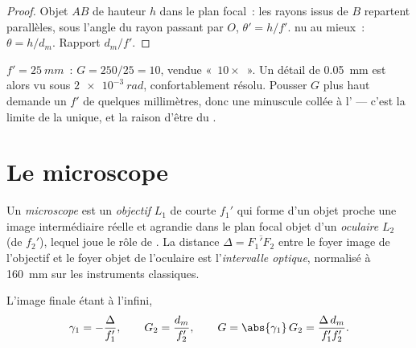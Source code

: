 \begin{proof}
Objet $AB$ de hauteur $h$ dans le plan focal~: les rayons issus de $B$
repartent parallèles, sous l'angle du rayon passant par $O$,
$\theta' = h/f'$.  nu au mieux~: $\theta = h/d_m$. Rapport $d_m/f'$.
\end{proof}

\begin{example}\label{ex:b1:optical-instruments:loupe}
$f' = \qty{25}{mm}$~: $G = 250/25 = 10$, vendue «~$10\times$~». Un détail
de \qty{0.05}{mm} est alors vu sous $\qty{2e-3}{rad}$, confortablement
résolu. Pousser $G$ plus haut demande un $f'$ de quelques millimètres,
donc une minuscule  collée à l' --- c'est la limite de la
 unique, et la raison d'être du .
\end{example}

\section{Le microscope}

\begin{definition}\label{def:b1:optical-instruments:microscope}
Un \emph{microscope} est un \emph{objectif} $L_1$ de courte  $f_1'$ qui forme d'un objet proche une image intermédiaire réelle
et agrandie dans le plan focal objet d'un \emph{oculaire} $L_2$ (de
 $f_2'$), lequel joue le rôle de . La distance $\Delta =
\overline{F_1'F_2}$ entre le foyer image de l'objectif et le foyer objet
de l'oculaire est l'\emph{intervalle optique}, normalisé à \qty{160}{mm}
sur les instruments classiques.
\end{definition}

\begin{proposition}\label{prop:b1:optical-instruments:microscope}
L'image finale étant à l'infini,
\[
\gamma_1 = -\frac{\Delta}{f_1'}, \qquad G_2 = \frac{d_m}{f_2'},
\qquad G = \abs{\gamma_1}\,G_2 = \frac{\Delta\,d_m}{f_1' f_2'} .
\]
\end{proposition}

